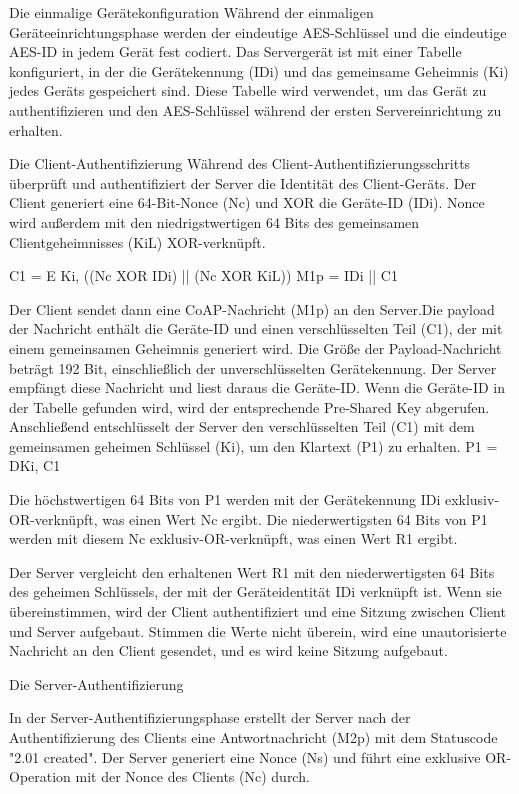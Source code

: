 Die einmalige Gerätekonfiguration
Während der einmaligen Geräteeinrichtungsphase werden der eindeutige AES-Schlüssel und die eindeutige AES-ID in jedem Gerät fest codiert. Das Servergerät ist mit einer Tabelle konfiguriert, in der die Gerätekennung (IDi) und das gemeinsame Geheimnis (Ki) jedes Geräts gespeichert sind. Diese Tabelle wird verwendet, um das Gerät zu authentifizieren und den AES-Schlüssel während der ersten Servereinrichtung zu erhalten.

Die Client-Authentifizierung
Während des Client-Authentifizierungsschritts überprüft und authentifiziert der Server die Identität des Client-Geräts. Der Client generiert eine 64-Bit-Nonce (Nc) und XOR die Geräte-ID (IDi). Nonce wird außerdem mit den niedrigstwertigen 64 Bits des gemeinsamen Clientgeheimnisses (KiL) XOR-verknüpft.

C1 = E {Ki, ((Nc XOR IDi) || (Nc XOR KiL))}
M1p = IDi || C1

Der Client sendet dann eine CoAP-Nachricht (M1p) an den Server.Die payload der Nachricht enthält die Geräte-ID und einen verschlüsselten Teil (C1), der mit einem gemeinsamen Geheimnis generiert wird. Die Größe der Payload-Nachricht beträgt 192 Bit, einschließlich der unverschlüsselten Gerätekennung. Der Server empfängt diese Nachricht und liest daraus die Geräte-ID. Wenn die Geräte-ID in der Tabelle gefunden wird, wird der entsprechende Pre-Shared Key abgerufen. Anschließend entschlüsselt der Server den verschlüsselten Teil (C1) mit dem gemeinsamen geheimen Schlüssel (Ki), um den Klartext (P1) zu erhalten.
P1 = D{Ki, C1}


Die höchstwertigen 64 Bits von P1 werden mit der Gerätekennung IDi exklusiv-OR-verknüpft, was einen Wert Nc ergibt. Die niederwertigsten 64 Bits von P1 werden mit diesem Nc exklusiv-OR-verknüpft, was einen Wert R1 ergibt.


Der Server vergleicht den erhaltenen Wert R1 mit den niederwertigsten 64 Bits des geheimen Schlüssels, der mit der Geräteidentität IDi verknüpft ist. Wenn sie übereinstimmen, wird der Client authentifiziert und eine Sitzung zwischen Client und Server aufgebaut. Stimmen die Werte nicht überein, wird eine unautorisierte Nachricht an den Client gesendet, und es wird keine Sitzung aufgebaut.



Die Server-Authentifizierung


In der Server-Authentifizierungsphase erstellt der Server nach der Authentifizierung des Clients eine Antwortnachricht (M2p) mit dem Statuscode "2.01 created". Der Server generiert eine Nonce (Ns) und führt eine exklusive OR-Operation mit der Nonce des Clients (Nc) durch. 

